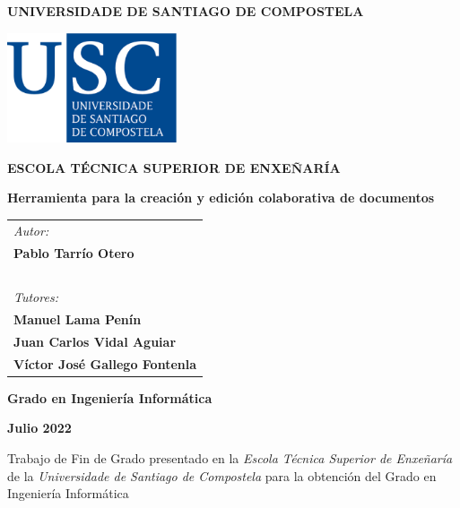 \pagestyle{empty}
\begin{center}
	{\bf\Large UNIVERSIDADE DE SANTIAGO DE COMPOSTELA}
	
	\vspace{0.5cm}
	\includegraphics[width=5cm]{figuras/logo_usc.eps}
	
	\vspace{0.5cm}
	{\bf\large ESCOLA TÉCNICA SUPERIOR DE ENXEÑARÍA}
	
	\vspace{3cm}
	{\bf\LARGE Herramienta para la creación y edición colaborativa de documentos}
	
\end{center}

\vspace{2cm}
\hspace{4cm}\begin{tabular}{l}
	{\it\Large Autor:} \\
	{\bf\Large Pablo Tarrío Otero} \\
	~ \\
	{\it\Large Tutores:} \\
	{\bf\Large Manuel Lama Penín} \\
	{\bf\Large Juan Carlos Vidal Aguiar} \\
	{\bf\Large Víctor José Gallego Fontenla} \\
\end{tabular}

\vspace{2cm}
\begin{center}
	{\bf\Large Grado en Ingeniería Informática}
	
	\vspace{0.5cm}
	{\bf\large Julio 2022}
	
	\vspace{0.5cm}
	Trabajo de Fin de Grado presentado en la {\it Escola Técnica Superior de Enxeñaría} de la {\it Universidade de Santiago de Compostela} para la obtención del Grado en Ingeniería Informática
\end{center}